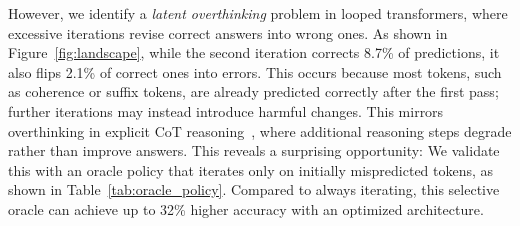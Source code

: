 
However, we identify a \textit{latent overthinking} problem in looped transformers, where excessive iterations revise correct answers into wrong ones.
As shown in Figure~\ref{fig:landscape}, while the second iteration corrects 8.7\% of predictions, it also flips 2.1\% of correct ones into errors.
This occurs because most tokens, such as coherence or suffix tokens, are already predicted correctly after the first pass; further iterations may instead introduce harmful changes.
This mirrors overthinking in explicit CoT reasoning~\citep{wu2025morelesscot}, where additional reasoning steps degrade rather than improve answers.
This reveals a surprising opportunity:
We validate this with an oracle policy that iterates only on initially mispredicted tokens, as shown in Table~\ref{tab:oracle_policy}. Compared to always iterating, this selective oracle can achieve up to 32\% higher accuracy with an optimized architecture.

